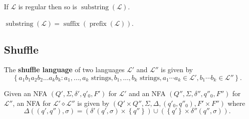 \documentclass{notes}
\begin{document}
\begin{thm}
  If $\mathcal L$ is regular then so is $\operatorname{substring}(\mathcal L)$.
\end{thm}

\begin{prf}
  $\operatorname{substring}(\mathcal L) = \operatorname{suffix}(\operatorname{prefix}(\mathcal L))$.
\end{prf}

\subsection{Shuffle}

\begin{defn}
  The {\boldmath \bfseries shuffle language} of two languages $\mathcal L'$ and $\mathcal L''$ is given by 
  \[
    \left \{ a_1 b_1 a_2 b_2 \dots a_k b_k : a_1, \dots, a_k \text{ strings}, b_1, \dots, b_k \text{ strings}, a_1 \cdots a_k \in \mathcal L', b_1 \cdots b_k \in \mathcal L'' \right \}.
  \]
\end{defn}

\begin{prf}
  Given an NFA $(Q', \Sigma, \delta', q'_0, F')$ for $\mathcal L'$ and an NFA $(Q'', \Sigma, \delta'', q''_0, F'')$ for $\mathcal L''$, an NFA for $\mathcal L' \diamond \mathcal L''$ is given by $(Q' \times Q'', \Sigma, \Delta, (q'_0, q''_0), F' \times F'')$ where 
  \[
    \Delta((q', q''), \sigma) = \left ( \delta'(q', \sigma) \times \left \{ q'' \right \} \right ) \cup \left ( \left \{ q' \right \} \times \delta''(q'', \sigma) \right ).
  \]
\end{prf}
\end{document}
